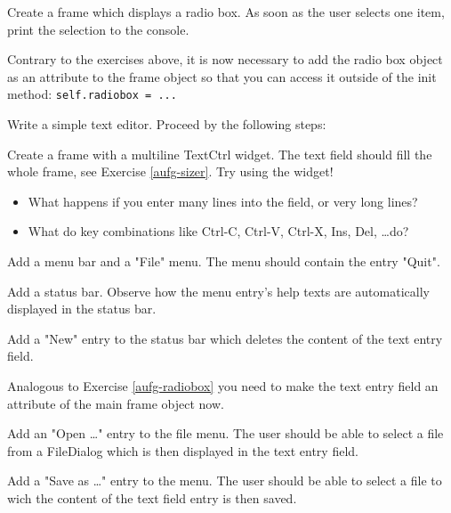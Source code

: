 \begin{aufgabe}[RadioBox]
\label{aufg-radiobox}
Create a frame which displays a radio box. As soon as the user selects one item, print the selection to the console.

\hinweis Contrary to the exercises above, it is now necessary to add the radio box object as an attribute to the frame object so that you can access it outside of the init method: \lstinline{self.radiobox = ...}
\end{aufgabe}

\begin{aufgabe}
Write a simple text editor. Proceed by the following steps:
\begin{teilaufgabe}
Create a frame with a multiline TextCtrl widget. The text field should fill the whole frame, see Exercise \ref{aufg-sizer}. Try using the widget!
\begin{itemize}
\item What happens if you enter many lines into the field, or very long lines?
\item What do key combinations like Ctrl-C, Ctrl-V, Ctrl-X, Ins, Del, \dots do? 
\end{itemize}
\end{teilaufgabe}
\begin{teilaufgabe}[Menus]
Add a menu bar and a "File" menu. The menu should contain the entry "Quit".
\end{teilaufgabe}
\begin{teilaufgabe}
Add a status bar. Observe how the menu entry's help texts are automatically displayed in the status bar.
\end{teilaufgabe}
\begin{teilaufgabe}
Add a "New" entry to the status bar which deletes the content of the text entry field.

\hinweis Analogous to Exercise \ref{aufg-radiobox} you need to make the text entry field an attribute of the main frame object now.
\end{teilaufgabe}
\begin{teilaufgabe}
Add an "Open \dots" entry to the file menu. The user should be able to select a file from a FileDialog which is then displayed in the text entry field.
\end{teilaufgabe}

\begin{teilaufgabe}[Save as]
Add a "Save as \dots" entry to the menu. The user should be able to select a file to wich the content of the text field entry is then saved.
\end{teilaufgabe}


\end{aufgabe}
